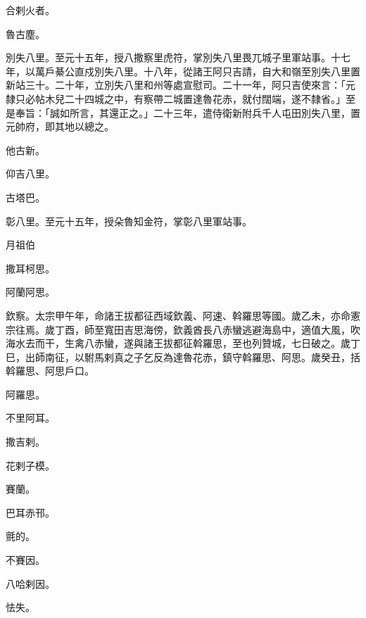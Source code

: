 \begin{pinyinscope}
 合剌火者。



 魯古塵。



 別失八里。至元十五年，授八撒察里虎符，掌別失八里畏兀城子里軍站事。十七年，以萬戶綦公直戍別失八里。十八年，從諸王阿只吉請，自大和嶺至別失八里置新站三十。二十年，立別失八里和州等處宣慰司。二十一年，阿只吉使來言：「元隸只必帖木兒二十四城之中，有察帶二城置達魯花赤，就付闊端，遂不隸省。」至是奉旨：「誠如所言，其還正之。」二十三年，遣侍衛新附兵千人屯田別失八里，置元帥府，即其地以總之。



 他古新。



 仰吉八里。



 古塔巴。



 彰八里。至元十五年，授朵魯知金符，掌彰八里軍站事。



 月祖伯



 撒耳柯思。



 阿蘭阿思。



 欽察。太宗甲午年，命諸王拔都征西域欽義、阿速、斡羅思等國。歲乙未，亦命憲宗往焉。歲丁酉，師至寬田吉思海傍，欽義酋長八赤蠻逃避海島中，適值大風，吹海水去而干，生禽八赤蠻，遂與諸王拔都征斡羅思，至也列贊城，七日破之。歲丁巳，出師南征，以駙馬剌真之子乞反為達魯花赤，鎮守斡羅思、阿思。歲癸丑，括斡羅思、阿思戶口。



 阿羅思。



 不里阿耳。



 撒吉剌。



 花剌子模。



 賽蘭。



 巴耳赤邗。



 氈的。



 不賽因。



 八哈剌因。



 怯失。




\end{pinyinscope}
